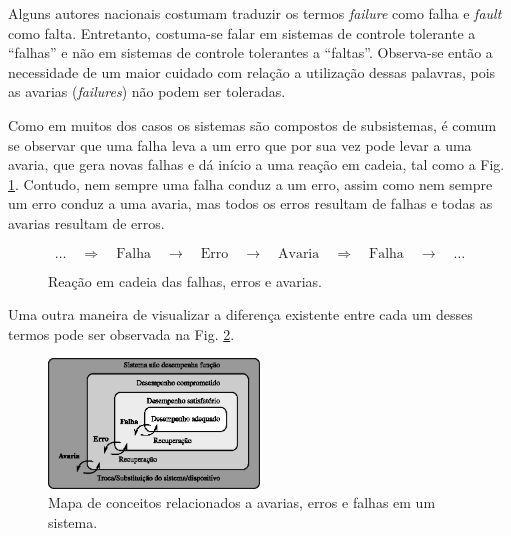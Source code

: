 Alguns autores nacionais costumam traduzir os termos {\it failure} como falha e
{\it fault} como falta. Entretanto, costuma-se falar em sistemas de controle
tolerante a ``falhas'' e não em sistemas de controle tolerantes a ``faltas''.
Observa-se então a necessidade de um maior cuidado com relação a utilização
dessas palavras, pois as avarias ({\it failures}) não podem ser toleradas.

Como em muitos dos casos os sistemas são compostos de subsistemas, é comum se
observar que uma falha leva a um erro que por sua vez pode levar a uma avaria,
que gera novas falhas e dá início a uma reação em cadeia, tal como a Fig.
\ref{fig:reacao_cadeia}. Contudo, nem sempre uma falha conduz a um erro, assim
como nem sempre um erro conduz a uma avaria, mas todos os erros resultam de
falhas e todas as avarias resultam de erros.

\begin{figure}[htb]
\centering
\[
\ldots
\quad\Longrightarrow\quad
\text{Falha} 
\quad\longrightarrow\quad
\text{Erro}
\quad\longrightarrow\quad
\text{Avaria}
\quad\Longrightarrow\quad
\text{Falha}
\quad\longrightarrow\quad
\ldots
\]
    \caption{Reação em cadeia das falhas, erros e avarias.}
    \label{fig:reacao_cadeia}
\end{figure}

Uma outra maneira de visualizar a diferença existente entre cada um desses
termos pode ser observada na Fig. \ref{fig:mapa_conceitos}.

\begin{figure}[htb]
\centering
    \includegraphics[width=0.5\textwidth]{imgs/detec_diag/eps/mapa_conceitos}
    \caption{Mapa de conceitos relacionados a avarias, erros e falhas em um
             sistema.}
    \label{fig:mapa_conceitos}
\end{figure}

